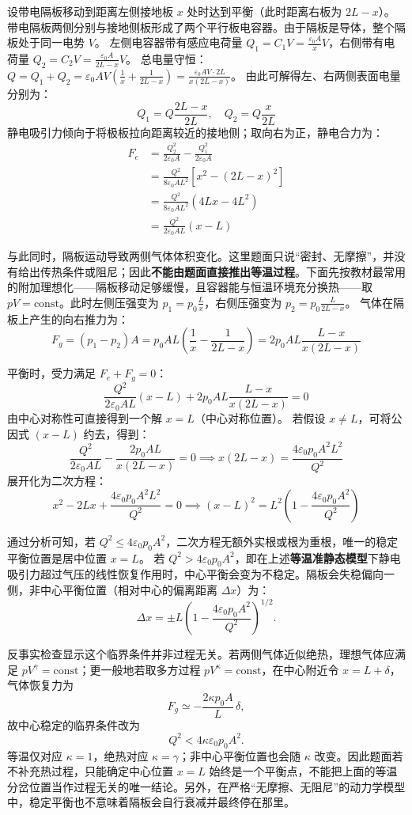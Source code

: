 \begin{solution}
设带电隔板移动到距离左侧接地板 $x$ 处时达到平衡（此时距离右板为 $2L - x$）。
带电隔板两侧分别与接地侧板形成了两个平行板电容器。由于隔板是导体，整个隔板处于同一电势 $V$。
左侧电容器带有感应电荷量 $Q_1 = C_1 V = \frac{\varepsilon_0 A}{x} V$，右侧带有电荷量 $Q_2 = C_2 V = \frac{\varepsilon_0 A}{2L - x} V$。
总电量守恒：$Q = Q_1 + Q_2 = \varepsilon_0 A V \left( \frac{1}{x} + \frac{1}{2L - x} \right) = \frac{\varepsilon_0 A V \cdot 2L}{x(2L - x)}$。
由此可解得左、右两侧表面电量分别为：
$$ Q_1 = Q \frac{2L - x}{2L}, \quad Q_2 = Q \frac{x}{2L} $$
静电吸引力倾向于将极板拉向距离较近的接地侧；取向右为正，静电合力为：
\[
\begin{aligned}
F_e &= \frac{Q_2^2}{2\varepsilon_0 A} - \frac{Q_1^2}{2\varepsilon_0 A}\\
  &= \frac{Q^2}{8\varepsilon_0 A L^2} \left[ x^2 - (2L - x)^2 \right]\\
  &= \frac{Q^2}{8\varepsilon_0 A L^2} (4Lx - 4L^2)\\
  &= \frac{Q^2}{2\varepsilon_0 A L} (x - L)
\end{aligned}
\]

与此同时，隔板运动导致两侧气体体积变化。这里题面只说“密封、无摩擦”，并没有给出传热条件或阻尼；因此\textbf{不能由题面直接推出等温过程}。下面先按教材最常用的附加理想化——隔板移动足够缓慢，且容器能与恒温环境充分换热——取 $pV=\mathrm{const}$。此时左侧压强变为 $p_1 = p_0 \frac{L}{x}$，右侧压强变为 $p_2 = p_0 \frac{L}{2L - x}$。
气体在隔板上产生的向右推力为：
$$ F_g = (p_1 - p_2) A = p_0 A L \left( \frac{1}{x} - \frac{1}{2L - x} \right) = 2p_0 A L \frac{L - x}{x(2L - x)} $$

平衡时，受力满足 $F_e + F_g = 0$：
$$ \frac{Q^2}{2\varepsilon_0 A L} (x - L) + 2p_0 A L \frac{L - x}{x(2L - x)} = 0 $$
由中心对称性可直接得到一个解 $x = L$（中心对称位置）。
若假设 $x \neq L$，可将公因式 $(x - L)$ 约去，得到：
$$ \frac{Q^2}{2\varepsilon_0 A L} - \frac{2p_0 A L}{x(2L - x)} = 0 \implies x(2L - x) = \frac{4\varepsilon_0 p_0 A^2 L^2}{Q^2} $$
展开化为二次方程：
$$ x^2 - 2Lx + \frac{4\varepsilon_0 p_0 A^2 L^2}{Q^2} = 0 \implies (x - L)^2 = L^2 \left( 1 - \frac{4\varepsilon_0 p_0 A^2}{Q^2} \right) $$

通过分析可知，若 $Q^2 \le 4\varepsilon_0 p_0 A^2$，二次方程无额外实根或根为重根，唯一的稳定平衡位置是居中位置 $x = L$。
若 $Q^2 > 4\varepsilon_0 p_0 A^2$，即在上述\textbf{等温准静态模型}下静电吸引力超过气压的线性恢复作用时，中心平衡会变为不稳定。隔板会失稳偏向一侧，非中心平衡位置（相对中心的偏离距离 $\Delta x$）为：
$$ \Delta x = \pm L \left( 1 - \frac{4\varepsilon_0 p_0 A^2}{Q^2} \right)^{1/2}. $$

反事实检查显示这个临界条件并非过程无关。若两侧气体近似绝热，理想气体应满足 $pV^\gamma=\mathrm{const}$；更一般地若取多方过程 $pV^\kappa=\mathrm{const}$，在中心附近令 $x=L+\delta$，气体恢复力为
$$ F_g\simeq-\frac{2\kappa p_0A}{L}\,\delta, $$
故中心稳定的临界条件改为
$$ \boxed{Q^2<4\kappa\varepsilon_0p_0A^2}. $$
等温仅对应 $\kappa=1$，绝热对应 $\kappa=\gamma$；非中心平衡位置也会随 $\kappa$ 改变。因此题面若不补充热过程，只能确定中心位置 $x=L$ 始终是一个平衡点，不能把上面的等温分岔位置当作过程无关的唯一结论。另外，在严格“无摩擦、无阻尼”的动力学模型中，稳定平衡也不意味着隔板会自行衰减并最终停在那里。
\end{solution}

